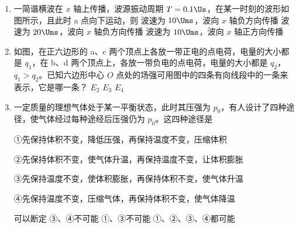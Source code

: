 \documentclass[\gkver]{gaokaozhenti}
\begin{document}
\begin{enumerate}
\item
一简谐横波在 $x$ 轴上传播，波源振动周期 $T=0.1\Us$，在某一时刻的波形如图所示，且此时 a 点向下运动，则
{波速为 $10\Ums$，波向 $x$ 轴负方向传播}
{波速为 $20\Ums$，波向 $x$ 轴负方向传播}
{波速为 $10\Ums$，波向 $x$ 轴正方向传播}

\item
如图，在正六边形的 a、c 两个顶点上各放一带正电的点电荷，电量的大小都是 $q_{1}$，在 b、d 两个顶点上，各放一带负电的点电荷，电量的大小都是 $q_{2}$，$q_{1}>q_{2}$。已知六边形中心 $O$ 点处的场强可用图中的四条有向线段中的一条来表示，它是哪一条？
{$E_{2}$}
{$E_{3}$}
{$E_{4}$}

\item
一定质量的理想气体处于某一平衡状态，此时其压强为 $p_{0}$，有人设计了四种途径，使气体经过每种途经后压强仍为 $p_{0}$。这四种途径是

①先保持体积不变，降低压强，再保持温度不变，压缩体积

②先保持体积不变，使气体升温，再保持温度不变，让体积膨胀

③先保持温度不变，使体积膨胀，再保持体积不变，使气体升温

④先保持温度不变，压缩气体，再保持体积不变，使气体降温

可以断定
{③、④不可能}
{①、③不可能}
{①、②、③、④都可能}


\end{enumerate}
\end{document}
